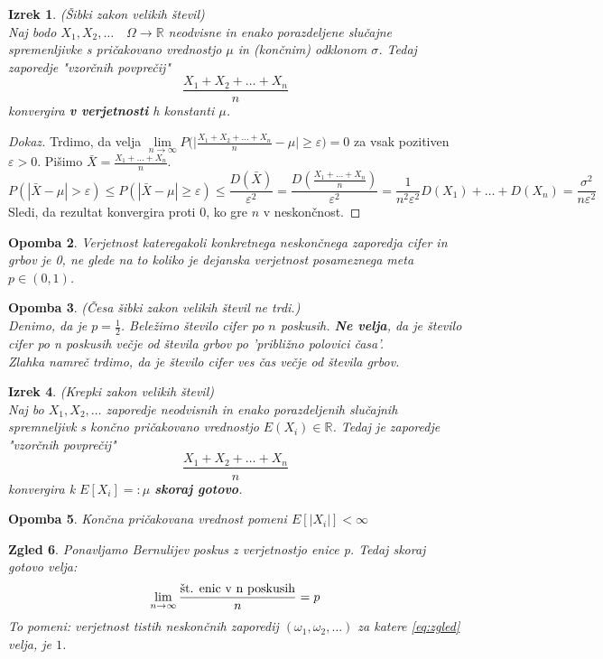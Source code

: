 \documentclass[11pt]{article}
\newtheorem{Izrek}{{\sc Izrek}}[section]
\newtheorem{Zgled}[Izrek]{{\sc Zgled}}
\newtheorem{Opomba}[Izrek]{{\sc Opomba}}
\newenvironment{dokaz}[1][{\sc Dokaz}]{\begin{proof}[#1]\renewcommand*{\qedsymbol}{\(\blacksquare\)}}{\end{proof}}
\begin{document}
	\begin{Izrek}\label{izrek:SZVS}
	(Šibki zakon velikih števil)
	\\
	Naj bodo $X_1, X_2, \ldots \quad \Omega \to \mathbb{R}$ neodvisne in enako porazdeljene slučajne spremenljivke s pričakovano vrednostjo $\mu$ in (končnim) odklonom $\sigma$. Tedaj zaporedje "vzorčnih povprečij" 
	$$\frac{X_1 + X_2 + \ldots + X_n}{n}$$
	konvergira \textbf{v verjetnosti} h konstanti $\mu$.
	\end{Izrek}
	\begin{dokaz}
		Trdimo, da velja $\lim\limits_{n \to \infty}{P(|\frac{X_1+X_2+\ldots + X_n}{n}} - \mu| \ge \varepsilon) = 0$ za vsak pozitiven $\varepsilon > 0$. Pišimo $\bar{X} = \frac{X_1+\ldots + X_n}{n}$.
		$$P(|\bar{X} - \mu | > \varepsilon) \le P(|\bar{X} - \mu | \ge \varepsilon) \le \frac{D(\bar{X})}{\varepsilon ^2} = \frac{D(\frac{X_1+ \ldots + X_n}{n})}{\varepsilon ^2} = \frac{1}{n^2 \varepsilon ^2}D(X_1) + \ldots + D(X_n) = \frac{\sigma ^2 }{n \varepsilon ^2}$$
		Sledi, da rezultat konvergira proti $0$, ko gre $n$ v neskončnost.
	\end{dokaz}
	\begin{Opomba}
		Verjetnost kateregakoli konkretnega neskončnega zaporedja cifer in grbov je 0, ne glede na to koliko je dejanska verjetnost posameznega meta $p\in (0,1)$.
	\end{Opomba}
	\begin{Opomba}
		(Česa šibki zakon velikih števil ne trdi.)
		\\
		Denimo, da je $p = \frac{1}{2}$. Beležimo število cifer po $n$ poskusih. \textbf{Ne velja}, da je število cifer po n poskusih večje od števila grbov po 'približno polovici časa'.
		\\
		Zlahka namreč trdimo, da je število cifer ves čas večje od števila grbov.
	\end{Opomba}
	\begin{Izrek}\label{izrek:KZVS}
		(Krepki zakon velikih števil)
		\\
		Naj bo $X_1, X_2, \ldots$ zaporedje neodvisnih in enako porazdeljenih slučajnih spremneljivk s končno pričakovano vrednostjo $E(X_i) \in \mathbb{R}$.
		Tedaj je zaporedje "vzorčnih povprečij"
		$$\frac{X_1 + X_2 + \ldots + X_n}{n}$$
		konvergira k $E[X_i] =: \mu$ \textbf{skoraj gotovo}.
	\end{Izrek}
	\begin{Opomba}
	Končna pričakovana vrednost pomeni $E[|X_i|] < \infty$
	\end{Opomba}
	\begin{Zgled}
		Ponavljamo Bernulijev poskus z verjetnostjo enice p. Tedaj skoraj gotovo velja:
		\begin{equation}\label{eq:zgled}
		\lim_{n\to \infty}{\frac{\textnormal{št. enic v n poskusih}}{n}} = p
		\end{equation}
		To pomeni: verjetnost tistih neskončnih zaporedij $( \omega_1, \omega_2, \ldots )$ za katere \eqref{eq:zgled} velja, je $1$.
	\end{Zgled}
\end{document}
